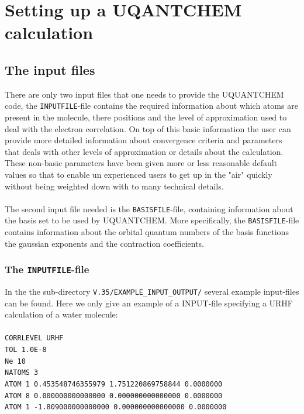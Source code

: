 \documentclass[a4paper,twoside,openany]{book}
\begin{document}
\chapter{Setting up a UQANTCHEM calculation}


\section{The input files}
There are only two input files that one needs to provide the UQUANTCHEM code, the \texttt{INPUTFILE}-file contains the required information about which atoms 
are present in the molecule, there positions and  the level of approximation used to deal with the electron correlation. On top of this basic information the user 
can provide more detailed information about convergence criteria and  parameters that deals with other levels of approximation or details about the calculation.
These non-basic parameters have been given more or less reasonable default values so that to enable un experienced users to get up in the "air" quickly without being 
weighted down with to many technical details. \\ \\
The second input file needed is the \texttt{BASISFILE}-file, containing information about the basis set to be used by UQUANTCHEM. More specifically, the \texttt{BASISFILE}-file
contains information about the orbital quantum numbers of the basis functions the gaussian exponents and the contraction coefficients. 


\subsection{The \texttt{INPUTFILE}-file}
In the the  sub-directory  \texttt{V.35/EXAMPLE\_INPUT\_OUTPUT/} several example input-files can be found.
Here we only give an example of a INPUT-file specifying a URHF calculation of a water molecule:\\ \\
\texttt{CORRLEVEL URHF}\\
\texttt{TOL 1.0E-8}\\
\texttt{Ne 10}\\
\texttt{NATOMS 3}\\
\texttt{ATOM 1  0.453548746355979 1.751220869758844 0.0000000}\\
\texttt{ATOM 8  0.000000000000000 0.000000000000000 0.0000000}\\
\texttt{ATOM 1 -1.809000000000000 0.000000000000000 0.0000000}
\end{document}
